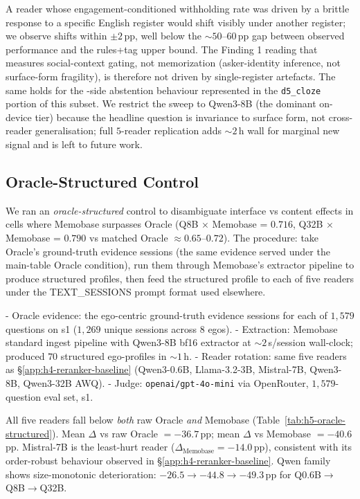 A reader whose engagement-conditioned withholding rate was driven by a brittle response to a specific English register would shift visibly under another register; we observe shifts within $\pm 2$\,pp, well below the $\sim$$50$--$60$\,pp gap between observed performance and the rules+tag upper bound. The Finding 1 reading that \DSixID measures social-context gating, not memorization (asker-identity inference, not surface-form fragility), is therefore not driven by single-register artefacts. The same holds for the \DFiveID-side abstention behaviour represented in the \texttt{d5\_cloze} portion of this subset. We restrict the sweep to Qwen3-8B (the dominant on-device tier) because the headline question is invariance to surface form, not cross-reader generalisation; full $5$-reader replication adds ${\sim}2$\,h wall for marginal new signal and is left to future work.

\subsection{Oracle-Structured Control}
\label{app:h5-oracle-structured}

We ran an \emph{oracle-structured} control to disambiguate interface vs content effects in cells where Memobase surpasses Oracle (Q8B × Memobase = $0.716$, Q32B × Memobase = $0.790$ vs matched Oracle $\approx 0.65$--$0.72$). The procedure: take Oracle's ground-truth evidence sessions (the same evidence served under the main-table Oracle condition), run them through Memobase's extractor pipeline to produce structured profiles, then feed the structured profile to each of five readers under the TEXT\_SESSIONS prompt format used elsewhere.

- Oracle evidence: the ego-centric ground-truth evidence sessions for each of $1{,}579$ questions on \benchL s1 ($1{,}269$ unique sessions across $8$ egos).
- Extraction: Memobase standard ingest pipeline with Qwen3-8B bf16 extractor at $\sim 2$\,s/session wall-clock; produced $70$ structured ego-profiles in $\sim 1$\,h.
- Reader rotation: same five readers as \S\ref{app:h4-reranker-baseline} (Qwen3-0.6B, Llama-3.2-3B, Mistral-7B, Qwen3-8B, Qwen3-32B AWQ).
- Judge: \texttt{openai/gpt-4o-mini} via OpenRouter, $1{,}579$-question eval set, s1.

All five readers fall below \emph{both} raw Oracle \emph{and} Memobase (Table~\ref{tab:h5-oracle-structured}). Mean $\Delta$ vs raw Oracle $= -36.7$\,pp; mean $\Delta$ vs Memobase $= -40.6$\,pp. Mistral-7B is the least-hurt reader ($\Delta_{\text{Memobase}} = -14.0$\,pp), consistent with its order-robust behaviour observed in \S\ref{app:h4-reranker-baseline}. Qwen family shows size-monotonic deterioration: $-26.5 \to -44.8 \to -49.3$\,pp for Q0.6B$\to$Q8B$\to$Q32B.

